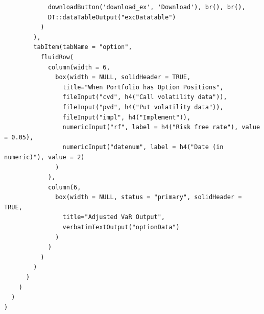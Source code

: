 \documentclass[letterpaper,11pt, oneside]{layout}
\begin{document}
\begin{spacing}{1}
\begin{lstlisting}
            downloadButton('download_ex', 'Download'), br(), br(),
            DT::dataTableOutput("excDatatable")
          )
        ),
        tabItem(tabName = "option",
          fluidRow(
            column(width = 6, 
              box(width = NULL, solidHeader = TRUE, 
                title="When Portfolio has Option Positions", 
                fileInput("cvd", h4("Call volatility data")),
                fileInput("pvd", h4("Put volatility data")),
                fileInput("impl", h4("Implement")),
                numericInput("rf", label = h4("Risk free rate"), value = 0.05),
                numericInput("datenum", label = h4("Date (in numeric)"), value = 2)
              )
            ),
            column(6, 
              box(width = NULL, status = "primary", solidHeader = TRUE, 
                title="Adjusted VaR Output",
                verbatimTextOutput("optionData")
              )
            )
          )
        )
      )
    )
  )
)
\end{lstlisting}
\end{spacing}


\end{document}
